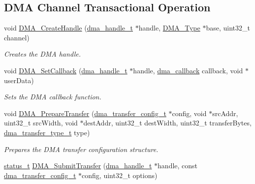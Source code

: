 \subsection*{D\+MA Channel Transactional Operation}
\begin{DoxyCompactItemize}
\item 
void \mbox{\hyperlink{group__dma_ga5354ff2c0c1ec53e2cbd712169fc5558}{D\+M\+A\+\_\+\+Create\+Handle}} (\mbox{\hyperlink{group__dma_gac4a65788d7e5762d16a41a50b2cd7956}{dma\+\_\+handle\+\_\+t}} $\ast$handle, \mbox{\hyperlink{struct_d_m_a___type}{D\+M\+A\+\_\+\+Type}} $\ast$base, uint32\+\_\+t channel)
\begin{DoxyCompactList}\small\item\em Creates the D\+MA handle. \end{DoxyCompactList}\item 
void \mbox{\hyperlink{group__dma_ga2eb9a831b9a84c5108097f770dbe90db}{D\+M\+A\+\_\+\+Set\+Callback}} (\mbox{\hyperlink{group__dma_gac4a65788d7e5762d16a41a50b2cd7956}{dma\+\_\+handle\+\_\+t}} $\ast$handle, \mbox{\hyperlink{group__dma_gab03f33ad69a5875d025f941419247123}{dma\+\_\+callback}} callback, void $\ast$user\+Data)
\begin{DoxyCompactList}\small\item\em Sets the D\+MA callback function. \end{DoxyCompactList}\item 
void \mbox{\hyperlink{group__dma_gaf6e0b93e92a31e0dd3398bce34decb40}{D\+M\+A\+\_\+\+Prepare\+Transfer}} (\mbox{\hyperlink{group__dma_gadb6e4baf9efcf14a889babc34d6f0d80}{dma\+\_\+transfer\+\_\+config\+\_\+t}} $\ast$config, void $\ast$src\+Addr, uint32\+\_\+t src\+Width, void $\ast$dest\+Addr, uint32\+\_\+t dest\+Width, uint32\+\_\+t transfer\+Bytes, \mbox{\hyperlink{group__dma_ga834a242c5bc2fc0fb4cf928616821de0}{dma\+\_\+transfer\+\_\+type\+\_\+t}} type)
\begin{DoxyCompactList}\small\item\em Prepares the D\+MA transfer configuration structure. \end{DoxyCompactList}\item 
\mbox{\hyperlink{group__ksdk__common_gaaabdaf7ee58ca7269bd4bf24efcde092}{status\+\_\+t}} \mbox{\hyperlink{group__dma_gadf9824800405f5b161bae1db1bf7d1f7}{D\+M\+A\+\_\+\+Submit\+Transfer}} (\mbox{\hyperlink{group__dma_gac4a65788d7e5762d16a41a50b2cd7956}{dma\+\_\+handle\+\_\+t}} $\ast$handle, const \mbox{\hyperlink{group__dma_gadb6e4baf9efcf14a889babc34d6f0d80}{dma\+\_\+transfer\+\_\+config\+\_\+t}} $\ast$config, uint32\+\_\+t options)

\end{DoxyCompactItemize}
